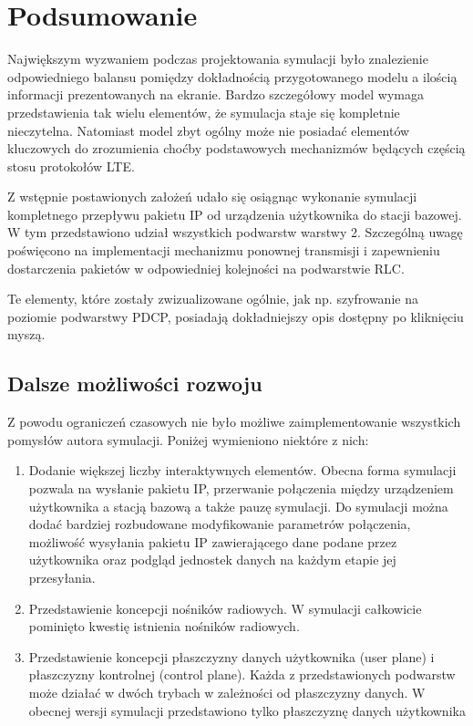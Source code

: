 \chapter{Podsumowanie}
\label{cha:podsumowanie}

Największym wyzwaniem podczas projektowania symulacji było znalezienie odpowiedniego balansu pomiędzy dokładnością przygotowanego modelu a ilością informacji prezentowanych na ekranie. Bardzo szczegółowy model wymaga przedstawienia tak wielu elementów, że symulacja staje się kompletnie nieczytelna. Natomiast model zbyt ogólny może nie posiadać elementów kluczowych do zrozumienia choćby podstawowych mechanizmów będących częścią stosu protokołów LTE.

Z wstępnie postawionych założeń udało się osiągnąc wykonanie symulacji kompletnego przepływu pakietu IP od urządzenia użytkownika do stacji bazowej. W tym przedstawiono udział wszystkich podwarstw warstwy 2. Szczególną uwagę poświęcono na implementacji mechanizmu ponownej transmisji i zapewnieniu dostarczenia pakietów w odpowiedniej kolejności na podwarstwie RLC.

Te elementy, które zostały zwizualizowane ogólnie, jak np. szyfrowanie na poziomie podwarstwy PDCP, posiadają dokładniejszy opis dostępny po kliknięciu myszą.

\section{Dalsze możliwości rozwoju}

Z powodu ograniczeń czasowych nie było możliwe zaimplementowanie wszystkich pomysłów autora symulacji. Poniżej wymieniono niektóre z nich:

\begin{enumerate}
	\item Dodanie większej liczby interaktywnych elementów. Obecna forma symulacji pozwala na wysłanie pakietu IP, przerwanie połączenia między urządzeniem użytkownika a stacją bazową a także pauzę symulacji. Do symulacji można dodać bardziej rozbudowane modyfikowanie parametrów połączenia, możliwość wysyłania pakietu IP zawierającego dane podane przez użytkownika oraz podgląd jednostek danych na każdym etapie jej przesyłania.
	\item Przedstawienie koncepcji nośników radiowych. W symulacji całkowicie pominięto kwestię istnienia nośników radiowych.
	\item Przedstawienie koncepcji płaszczyzny danych użytkownika (user plane) i płaszczyzny kontrolnej (control plane). Każda z przedstawionych podwarstw może działać w dwóch trybach w zależności od płaszczyzny danych. W obecnej wersji symulacji przedstawiono tylko płaszczyznę danych użytkownika
\end{enumerate}

